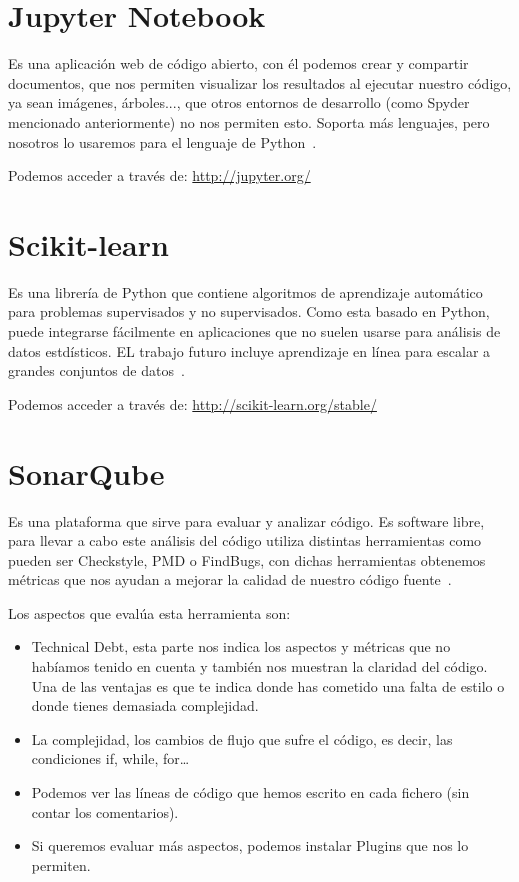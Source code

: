 \section{Jupyter Notebook}
Es una aplicación web de código abierto, con él podemos crear y compartir documentos, que nos permiten visualizar los resultados al ejecutar nuestro código, ya sean imágenes, árboles..., que otros entornos de desarrollo (como Spyder mencionado anteriormente) no nos permiten esto.
Soporta más lenguajes, pero nosotros lo usaremos para el lenguaje de Python~\cite{jupyter}.

Podemos acceder a través de: 
\url{http://jupyter.org/}	

\section{Scikit-learn}
Es una librería de Python que contiene algoritmos de aprendizaje automático para problemas supervisados y no supervisados. Como esta basado en Python, puede integrarse fácilmente en aplicaciones que no suelen usarse para análisis de datos estdísticos. EL trabajo futuro incluye aprendizaje en línea para escalar a grandes conjuntos de datos~\cite{scikitlearn}. 

Podemos acceder a través de: 
\url{http://scikit-learn.org/stable/}

\section{SonarQube}
Es una plataforma que sirve para evaluar y analizar código. Es software libre, para llevar a cabo este análisis del código utiliza distintas herramientas como pueden ser Checkstyle, PMD o FindBugs, con dichas herramientas obtenemos métricas que nos ayudan a mejorar la calidad de nuestro código fuente~\cite{wiki:sonarqube}.

Los aspectos que evalúa esta herramienta son:
\begin{itemize}
	\item Technical Debt, esta parte nos indica los aspectos y métricas que no habíamos tenido en cuenta y también nos muestran la claridad del código. Una de las ventajas es que te indica donde has cometido una falta de estilo o donde tienes demasiada complejidad.
	\item La complejidad, los cambios de flujo que sufre el código, es decir, las condiciones if, while, for… 
	\item Podemos ver las líneas de código que hemos escrito en cada fichero (sin contar los comentarios).
	\item Si queremos evaluar más aspectos, podemos instalar Plugins que nos lo permiten.
\end{itemize}

